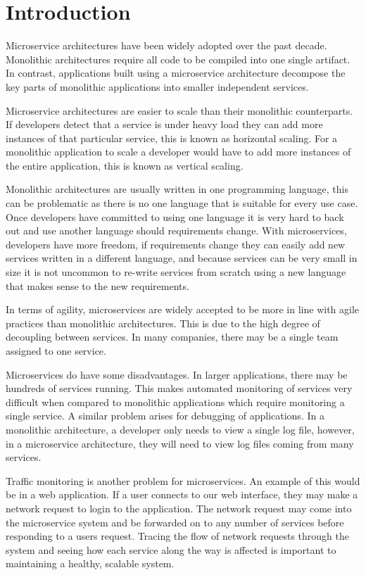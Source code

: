 \chapter{Introduction}

Microservice architectures have been widely adopted over the past decade. Monolithic architectures require all code to be compiled into one single artifact. In contrast, applications built using a microservice architecture decompose the key parts of monolithic applications into smaller independent services. 

Microservice architectures are easier to scale than their monolithic counterparts. If developers detect that a service is under heavy load they can add more instances of that particular service, this is known as horizontal scaling. For a monolithic application to scale a developer would have to add more instances of the entire application, this is known as vertical scaling. 

Monolithic architectures are usually written in one programming language, this can be problematic as there is no one language that is suitable for every use case. Once developers have committed to using one language it is very hard to back out and use another language should requirements change. With microservices, developers have more freedom, if requirements change they can easily add new services written in a different language, and because services can be very small in size it is not uncommon to re-write services from scratch using a new language that makes sense to the new requirements.

In terms of agility, microservices are widely accepted to be more in line with agile practices than monolithic architectures. This is due to the high degree of decoupling between services. In many companies, there may be a single team assigned to one service.

Microservices do have some disadvantages. In larger applications, there may be hundreds of services running. This makes automated monitoring of services very difficult when compared to monolithic applications which require monitoring a single service. A similar problem arises for debugging of applications. In a monolithic architecture, a developer only needs to view a single log file, however, in a microservice architecture, they will need to view log files coming from many services. 

Traffic monitoring is another problem for microservices. An example of this would be in a web application. If a user connects to our web interface, they may make a network request to login to the application. The network request may come into the microservice system and be forwarded on to any number of services before responding to a users request. Tracing the flow of network requests through the system and seeing how each service along the way is affected is important to maintaining a healthy, scalable system. 

